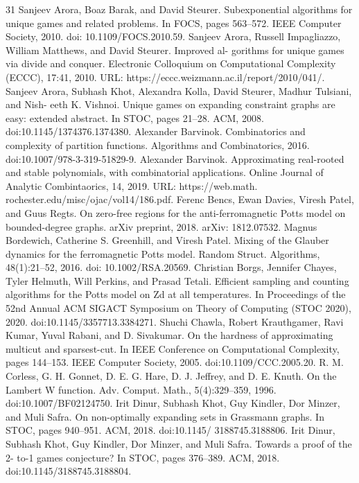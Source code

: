 \documentclass[10pt,a4paper]{article}
\theoremstyle{definition}
\begin{document}
\begin{thebibliography}{31}
Sanjeev Arora, Boaz Barak, and David Steurer. Subexponential algorithms for unique games and related problems. In FOCS, pages 563–572. IEEE Computer Society, 2010. doi: 10.1109/FOCS.2010.59.
Sanjeev Arora, Russell Impagliazzo, William Matthews, and David Steurer. Improved al- gorithms for unique games via divide and conquer. Electronic Colloquium on Computational Complexity (ECCC), 17:41, 2010. URL: https://eccc.weizmann.ac.il/report/2010/041/.
Sanjeev Arora, Subhash Khot, Alexandra Kolla, David Steurer, Madhur Tulsiani, and Nish- eeth K. Vishnoi. Unique games on expanding constraint graphs are easy: extended abstract. In STOC, pages 21–28. ACM, 2008. doi:10.1145/1374376.1374380.
Alexander Barvinok. Combinatorics and complexity of partition functions. Algorithms and Combinatorics, 2016. doi:10.1007/978-3-319-51829-9.
Alexander Barvinok. Approximating real-rooted and stable polynomials, with combinatorial applications. Online Journal of Analytic Combintaorics, 14, 2019. URL: https://web.math. rochester.edu/misc/ojac/vol14/186.pdf.
Ferenc Bencs, Ewan Davies, Viresh Patel, and Guus Regts. On zero-free regions for the anti-ferromagnetic Potts model on bounded-degree graphs. arXiv preprint, 2018. arXiv: 1812.07532.
Magnus Bordewich, Catherine S. Greenhill, and Viresh Patel. Mixing of the Glauber dynamics for the ferromagnetic Potts model. Random Struct. Algorithms, 48(1):21–52, 2016. doi: 10.1002/RSA.20569.
Christian Borgs, Jennifer Chayes, Tyler Helmuth, Will Perkins, and Prasad Tetali. Efficient sampling and counting algorithms for the Potts model on Zd at all temperatures. In Proceedings of the 52nd Annual ACM SIGACT Symposium on Theory of Computing (STOC 2020), 2020. doi:10.1145/3357713.3384271.
Shuchi Chawla, Robert Krauthgamer, Ravi Kumar, Yuval Rabani, and D. Sivakumar. On the hardness of approximating multicut and sparsest-cut. In IEEE Conference on Computational Complexity, pages 144–153. IEEE Computer Society, 2005. doi:10.1109/CCC.2005.20.
R. M. Corless, G. H. Gonnet, D. E. G. Hare, D. J. Jeffrey, and D. E. Knuth. On the Lambert W function. Adv. Comput. Math., 5(4):329–359, 1996. doi:10.1007/BF02124750.
Irit Dinur, Subhash Khot, Guy Kindler, Dor Minzer, and Muli Safra. On non-optimally expanding sets in Grassmann graphs. In STOC, pages 940–951. ACM, 2018. doi:10.1145/ 3188745.3188806.
Irit Dinur, Subhash Khot, Guy Kindler, Dor Minzer, and Muli Safra. Towards a proof of the 2- to-1 games conjecture? In STOC, pages 376–389. ACM, 2018. doi:10.1145/3188745.3188804.

\end{thebibliography}
\end{document}
